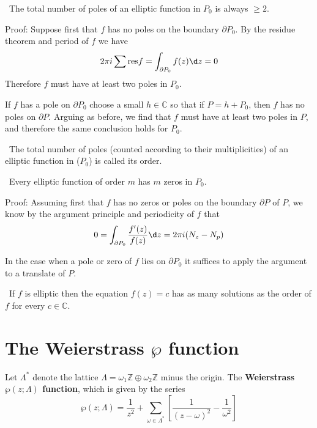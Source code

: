 \documentclass[12pt, oneside]{book}
\begin{document}
\begin{theorem}\
    The total number of poles of an elliptic function in $P_0$ is always $\geq 2$.

    Proof: Suppose first that $f$ has no poles on the boundary $\partial P_0$. By the residue theorem and period of $f$ we have
    $$2\pi i\sum\mathrm{res}f=\int_{\partial P_0}f(z)\d z=0$$
    Therefore $f$ must have at least two poles in $P_0$.

    If $f$ has a pole on $\partial P_0$ choose a small $h\in \mathbb{C}$ so that if $P= h +P_0$, then $f$ has no poles on $\partial P$. Arguing as before, we find that $f$ must have at least two poles in $P$, and therefore the same conclusion holds for $P_0$.
\end{theorem}
\begin{theorem}\
    The total number of poles (counted according to their multiplicities) of an elliptic function in ($P_0$) is called its order.
\end{theorem}
\begin{theorem}\
    Every elliptic function of order $m$ has $m$ zeros in $P_0$.

    Proof: Assuming first that $f$ has no zeros or poles on the boundary $\partial P$ of $P$, we know by the argument principle and periodicity of $f$ that
    $$0=\int_{\partial P_0}\frac{f'(z)}{f(z)}\d z=2\pi i(N_z-N_p)$$

    In the case when a pole or zero of $f$ lies on $\partial P_0$ it suffices to apply the argument to a translate of $P$.
\end{theorem}
\begin{corollary}\
    If $f$ is elliptic then the equation $f(z) = c$ has as
    many solutions as the order of $f$ for every $c\in\mathbb{C}$.
\end{corollary}

\section{The Weierstrass \texorpdfstring{$\wp$}{} function} %

\begin{definition}
    Let $\Lambda^*$ denote the lattice $\Lambda=\omega_1\mathbb{Z}\oplus \omega_2\mathbb{Z}$
    minus the origin.
    The \textbf{Weierstrass $\wp(z;\Lambda)$ function}, which is given by the series
    \begin{equation*}
        \wp(z;\Lambda)
        =
        \frac{1}{z^2}
        +
        \sum_{\omega\in\Lambda^*}\left[\frac{1}{(z-\omega)^2}-\frac{1}{\omega^2}\right]
    \end{equation*}
\end{definition}
\end{document}

